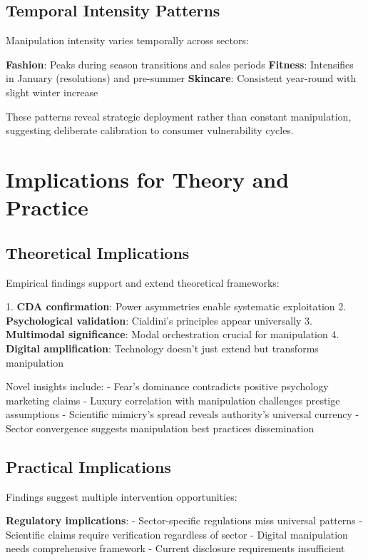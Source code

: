 \subsection{Temporal Intensity Patterns}

Manipulation intensity varies temporally across sectors:

\textbf{Fashion}: Peaks during season transitions and sales periods
\textbf{Fitness}: Intensifies in January (resolutions) and pre-summer
\textbf{Skincare}: Consistent year-round with slight winter increase

These patterns reveal strategic deployment rather than constant manipulation, suggesting deliberate calibration to consumer vulnerability cycles.

\section{Implications for Theory and Practice}
\label{sec:empirical_implications}

\subsection{Theoretical Implications}

Empirical findings support and extend theoretical frameworks:

1. \textbf{CDA confirmation}: Power asymmetries enable systematic exploitation
2. \textbf{Psychological validation}: Cialdini's principles appear universally
3. \textbf{Multimodal significance}: Modal orchestration crucial for manipulation
4. \textbf{Digital amplification}: Technology doesn't just extend but transforms manipulation

Novel insights include:
- Fear's dominance contradicts positive psychology marketing claims
- Luxury correlation with manipulation challenges prestige assumptions
- Scientific mimicry's spread reveals authority's universal currency
- Sector convergence suggests manipulation best practices dissemination

\subsection{Practical Implications}

Findings suggest multiple intervention opportunities:

\textbf{Regulatory implications}:
- Sector-specific regulations miss universal patterns
- Scientific claims require verification regardless of sector
- Digital manipulation needs comprehensive framework
- Current disclosure requirements insufficient

